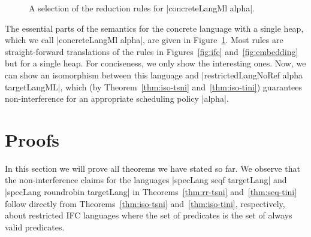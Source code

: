 \begin{figure}
  
  
  \caption{A selection of the reduction rules for |concreteLangMl alpha|.}
  \label{fig:concrete}
\end{figure}

The essential parts of the semantics for the concrete language
with a single heap,
which we call |concreteLangMl alpha|,
are given in Figure~\ref{fig:concrete}.  Most rules are
straight-forward translations of the rules in Figures~\ref{fig:ifc}
and~\ref{fig:embedding} but for a single heap.  For conciseness, we
only show the interesting ones.
Now, we can show an isomorphism between this language and
|restrictedLangNoRef alpha targetLangML|, which
(by Theorem~\ref{thm:iso-tsni} and~\ref{thm:iso-tini}) guarantees
non-interference for an appropriate scheduling policy |alpha|.



\section{Proofs}
\label{sec:proofs}

In this section we will prove all theorems we have stated so far.
We observe that the non-interference claims for the languages
|specLang seqf targetLang| and |specLang roundrobin targetLang|
in Theorems~\ref{thm:rr-tsni} and~\ref{thm:seq-tini} follow directly
from Theorems~\ref{thm:iso-tsni} and~\ref{thm:iso-tini},
respectively, about restricted IFC languages where the set
of predicates is the set of always valid predicates.

